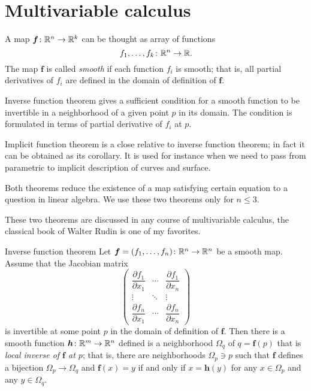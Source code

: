

\section{Multivariable calculus}

A map $\bm{f}\colon\mathbb{R}^n\to\mathbb{R}^k$ can be thought as array of functions 
\[f_1,\dots,f_k\colon\mathbb{R}^n\to \mathbb{R}.\]
The map $\bm{f}$ is called \emph{smooth} if each function $f_i$ is smooth;
that is, all partial derivatives of $f_i$ are defined in the domain of definition of $\bm{f}$.

Inverse function theorem gives a sufficient condition for a smooth function to be invertible in a neighborhood of a given point $p$ in its domain.
The condition is formulated in terms of partial derivative of $f_i$ at $p$.

Implicit function theorem is a close relative to inverse function theorem;
in fact it can be obtained as its corollary.
It is used for instance when we need to pass from parametric to implicit description of curves and surface.

Both theorems reduce the existence of a map satisfying certain equation to a question in linear algebra. 
We use these two theorems only for $n\le 3$.

These two theorems are discussed in any course of multivariable calculus, the classical book of Walter Rudin \cite{rudin} is one of my favorites.

\begin{thm}{Inverse function theorem}\label{thm:inverse}
Let $\bm{f}=(f_1,\dots,f_n)\colon\mathbb{R}^n\to\mathbb{R}^n$ be a smooth map.
Assume that the Jacobian matrix
\[
\begin{pmatrix}
\dfrac{\partial f_1}{\partial x_1} & \cdots & \dfrac{\partial f_1}{\partial x_n}\\
\vdots & \ddots & \vdots\\
\dfrac{\partial f_n}{\partial x_1} & \cdots & \dfrac{\partial f_n}{\partial x_n} \end{pmatrix}\]
is invertible at some point $p$ in the domain of definition of $\bm{f}$.
Then there is a smooth function $\bm{h}\colon\mathbb{R}^m\to\mathbb{R}^n$ defined is a neighborhood $\Omega_q$ of $q=\bm{f}(p)$ that is \emph{local inverse of $\bm{f}$ at $p$};
that is, there are neighborhoods $\Omega_p\ni p$ such that
$\bm{f}$ defines a bijection $\Omega_p\to \Omega_q$ and
$\bm{f}(x)=y$ if and only if $x=\bm{h}(y)$ for any $x\in \Omega_p$ and any $y\in \Omega_q$.
\end{thm}

